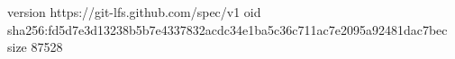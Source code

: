 version https://git-lfs.github.com/spec/v1
oid sha256:fd5d7e3d13238b5b7e4337832acdc34e1ba5c36c711ac7e2095a92481dac7bec
size 87528
